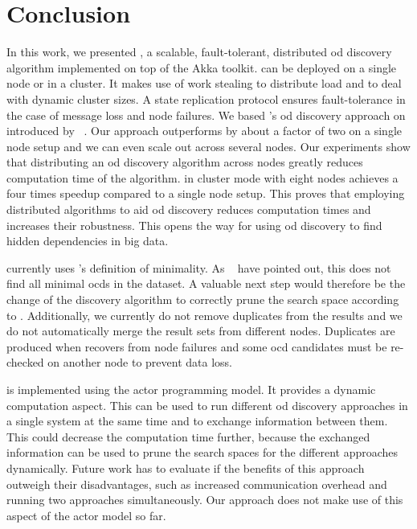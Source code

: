 
\section{Conclusion}\label{sec:conclusion}

  In this work, we presented \dodo{}, a scalable, fault-tolerant, distributed \gls{od} discovery algorithm implemented on top of the Akka toolkit.
  \dodo{} can be deployed on a single node or in a cluster.
  It makes use of work stealing to distribute load and to deal with dynamic cluster sizes.
  A state replication protocol ensures fault-tolerance in the case of message loss and node failures.
  We based \dodo{}'s \gls{od} discovery approach on \ocddiscover{} introduced by \citeauthor{consonni}~\cite{consonni}.
  Our approach outperforms \ocddiscover{} by about a factor of two on a single node setup and we can even scale out across several nodes.
  Our experiments show that distributing an \gls{od} discovery algorithm across nodes greatly reduces computation time of the algorithm.
  \dodo{} in cluster mode with eight nodes achieves a four times speedup compared to a single node \dodo{} setup.
  This proves that employing distributed algorithms to aid \gls{od} discovery reduces computation times and increases their robustness.
  This opens the way for using \gls{od} discovery to find hidden dependencies in big data.

  \dodo{} currently uses \citeauthor{consonni}'s definition of minimality.
  As \citeauthor{szlichta:errata}~\cite{szlichta:errata} have pointed out, this does not find all minimal \glspl{ocd} in the dataset.
  A valuable next step would therefore be the change of the discovery algorithm to correctly prune the search space according to \cite{szlichta:errata}.
  Additionally, we currently do not remove duplicates from the results and we do not automatically merge the result sets from different nodes.
  Duplicates are produced when \dodo{} recovers from node failures and some \gls{ocd} candidates must be re-checked on another node to prevent data loss.

  \dodo{} is implemented using the actor programming model.
  It provides a dynamic computation aspect.
  This can be used to run different \gls{od} discovery approaches in a single system at the same time and to exchange information between them.
  This could decrease the computation time further, because the exchanged information can be used to prune the search spaces for the different approaches dynamically.
  Future work has to evaluate if the benefits of this approach outweigh their disadvantages, such as increased communication overhead and running two approaches simultaneously.
  Our approach does not make use of this aspect of the actor model so far.

